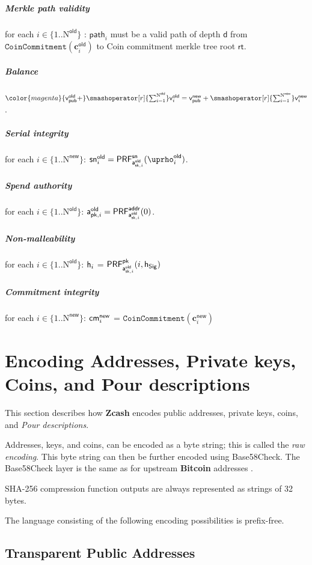 \documentclass{article}
\newcommand{\changedcolor}{magenta}
\newcommand{\setchanged}{\color{\changedcolor}}
\newcommand{\changed}[1]{{\setchanged{#1}}}
\newcommand{\term}[1]{\textsl{#1}\xspace}
\newcommand{\termbf}[1]{\textbf{#1}\xspace}
\newcommand{\Zcash}{\termbf{Zcash}}
\newcommand{\Bitcoin}{\termbf{Bitcoin}}
\newcommand{\PourDescriptions}{\term{Pour descriptions}}
\newcommand{\SpendAuthorityPublicOld}[1]{\mathsf{a^{old}_{pk,\mathnormal{#1}}}}
\newcommand{\SpendAuthorityPrivateOld}[1]{\mathsf{a^{old}_{sk,\mathnormal{#1}}}}
\newcommand{\CoinAddressRandOld}[1]{\mathsf{\uprho^{old}_\mathnormal{#1}}}
\newcommand{\PRF}[2]{\mathsf{{PRF}^{#2}_\mathnormal{#1}}}
\newcommand{\PRFaddr}[1]{\PRF{#1}{addr}}
\newcommand{\PRFsn}[1]{\PRF{#1}{sn}}
\newcommand{\PRFpk}[1]{\PRF{#1}{pk}}
\newcommand{\cmNew}[1]{\mathsf{{cm}^{new}_\mathnormal{#1}}}
\newcommand{\MerkleDepth}{\mathsf{d}}
\newcommand{\snOld}[1]{\mathsf{{sn}^{old}_\mathnormal{#1}}}
\newcommand{\vsum}[2]{\smashoperator[r]{\sum_{#1}^{#2}}}
\newcommand{\rt}{\mathsf{rt}}
\newcommand{\hSig}{\mathsf{h_{Sig}}}
\newcommand{\h}[1]{\mathsf{h_{\mathnormal{#1}}}}
\newcommand{\NOld}{\mathrm{N}^\mathsf{old}}
\newcommand{\NNew}{\mathrm{N}^\mathsf{new}}
\newcommand{\vpubOld}{\mathsf{v_{pub}^{old}}}
\newcommand{\vpubNew}{\mathsf{v_{pub}^{new}}}
\newcommand{\cOld}[1]{\mathbf{c}_{#1}^\mathsf{old}}
\newcommand{\cNew}[1]{\mathbf{c}_{#1}^\mathsf{new}}
\newcommand{\vOld}[1]{\mathsf{v}_{#1}^\mathsf{old}}
\newcommand{\vNew}[1]{\mathsf{v}_{#1}^\mathsf{new}}
\newcommand{\treepath}[1]{\mathsf{path}_{#1}}
\newcommand{\CoinCommitment}[1]{\mathtt{CoinCommitment}(#1)}
\begin{document}
\subparagraph{Merkle path validity}

for each $i \in \{1..\NOld\}$ \changed{$\mid$ $\vOld{i} \neq 0$}: $\treepath{i}$ must be a valid path
of depth $\MerkleDepth$ from \linebreak $\CoinCommitment{\cOld{i}}$ to Coin 
commitment merkle tree root $\rt$.

\subparagraph{Balance}

$\changed{\vpubOld +} \vsum{i=1}{\NOld} \vOld{i} = \vpubNew + \vsum{i=1}{\NNew} \vNew{i}$.

\subparagraph{Serial integrity}

for each $i \in \{1..\NNew\}$: 
$\snOld{i} = \PRFsn{\SpendAuthorityPrivateOld{i}}(\CoinAddressRandOld{i})$.

\subparagraph{Spend authority}

for each $i \in \{1..\NOld\}$:
$\SpendAuthorityPublicOld{i} = \PRFaddr{\SpendAuthorityPrivateOld{i}}(0)$.

\subparagraph{Non-malleability}

for each $i \in \{1..\NOld\}$: $\h{i}$ = $\PRFpk{\SpendAuthorityPrivateOld{i}}(i, \hSig)$

\subparagraph{Commitment integrity}

for each $i \in \{1..\NNew\}$: $\cmNew{i}$ = $\CoinCommitment{\cNew{i}}$

\section{Encoding Addresses, Private keys, Coins, and Pour descriptions}

This section describes how \Zcash encodes public addresses, private keys,
coins, and \PourDescriptions.

Addresses, keys, and coins, can be encoded as a byte string; this is called
the \term{raw encoding}. This byte string can then be further encoded using
Base58Check. The Base58Check layer is the same as for upstream \Bitcoin
addresses \cite{Base58Check}.

SHA-256 compression function outputs are always represented as strings of 32
bytes.

The language consisting of the following encoding possibilities is prefix-free.

\subsection{Transparent Public Addresses}
\end{document}
